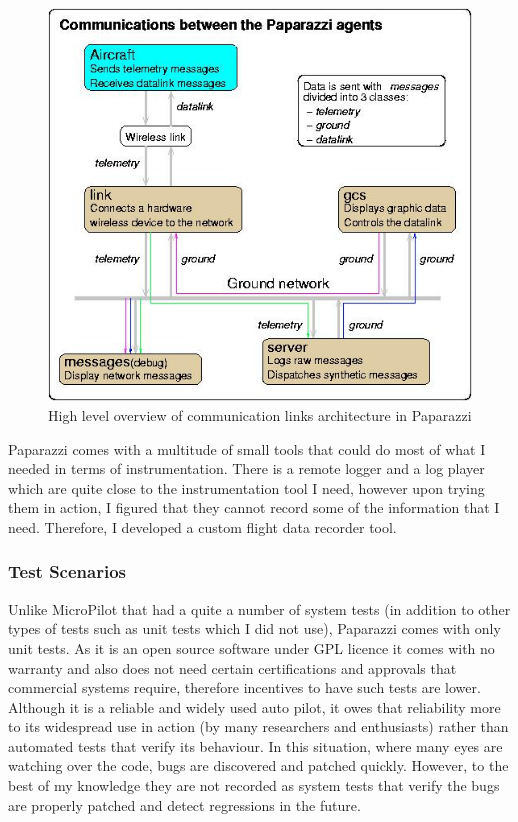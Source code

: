 \begin{figure}
    \centering
    \includegraphics[width=\columnwidth]{4_files/Pprz_communication_agents.jpg}
    \caption{High level overview of communication links architecture in Paparazzi \cite{hattenberger2014using}}
    \label{fig:paparazzi_comm_agents}
\end{figure}

Paparazzi comes with a multitude of small tools that could do most of what I needed in terms of instrumentation. There is a remote logger and a log player which are quite close to the instrumentation tool I need, however upon trying them in action, I figured that they cannot record some of the information that I need. Therefore, I developed a custom flight data recorder tool. 

\subsubsection{Test Scenarios}
Unlike MicroPilot that had a quite a number of system tests (in addition to other types of tests such as unit tests which I did not use), Paparazzi comes with only unit tests. As it is an open source software under GPL licence it comes with no warranty and also does not need certain certifications and approvals that commercial systems require, therefore incentives to have such tests are lower. 
Although it is a reliable and widely used auto pilot, it owes that reliability more to its widespread use in action (by many researchers and enthusiasts) rather than automated tests that verify its behaviour.
In this situation, where many eyes are watching over the code, bugs are discovered and patched quickly. However, to the best of my knowledge they are not recorded as system tests that verify the bugs are properly patched and detect regressions in the future.

